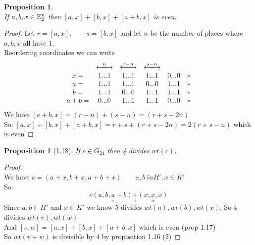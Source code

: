 \documentclass[]{article}
\newtheorem{prop}[thm]{Proposition}
\theoremstyle{definition}
\theoremstyle{remark}
\numberwithin{equation}{section}
\begin{document}
		\begin{prop}\hfill\\
			If $a,b,x \in \mathbb{Z}_2^n$ then $[a,x] + [b,x] + [a+b,x]$ is even.\\
		\end{prop}
		\begin{proof}
			Let $r = [a,x],\qquad s = [b,x]$ and let $n$ be the number of places where $a,b,x$ all have 1.\\
			Reordering coordinates we can write
				\[
					\begin{matrix}
						& \xlongleftrightarrow{n} & \xlongleftrightarrow{r-n} & \xlongleftrightarrow{s-n}\\
					x  =& 1 ... 1  		&1 ... 1 			&1 ...1		&0 ...0		  & *  \\
					a  =& 1 ... 1  		&1 ... 1 			&0 ...0		&1 ...1		  & *  \\
					b  =& 1 ... 1  		&0 ... 0 			&1 ...1		&1 ...1		  & *  \\
					a+b=& 0 ... 0  		&1 ... 1 			&1 ...1		&0 ...0		  & *  \\
					\end{matrix}
				\]
				We have $[a+b, x] = (r-n) + (s-n) = (r+s-2n)$\\
				So: $[a,x] + [b,x] + [a+b,x] = r+s + (r+s-2n) = 2(r+s-n)$ which is even
		\end{proof}

		\begin{prop}[1.18]
		If $c \in G_24$ then 4 divides $wt(c)$.
		\end{prop}

		\begin{proof}\hfill\\
			We have $c = (a+x, b+x, a+b+x)\qquad a,b \ in H', x\in K'$\\
			So:
			\[c \underset{v}{(a,b, a+b)} \underset{+}{+} \underset{w}{(x,x,x)}\]
			Since $a,b \in H'$ and $x\in K'$ we know 5 divides $wt(a), wt(b), wt(x)$.
			So 4 divides $wt(v), wt(w)$\\
			And $[v,w] = [a,x] + [b,x] + [a+b, x]$ which is even (prop 1.17)\\
			So $wt(v+w)$ is divisible by 4 by proposition 1.16 (2)\end{proof}
\end{document}
